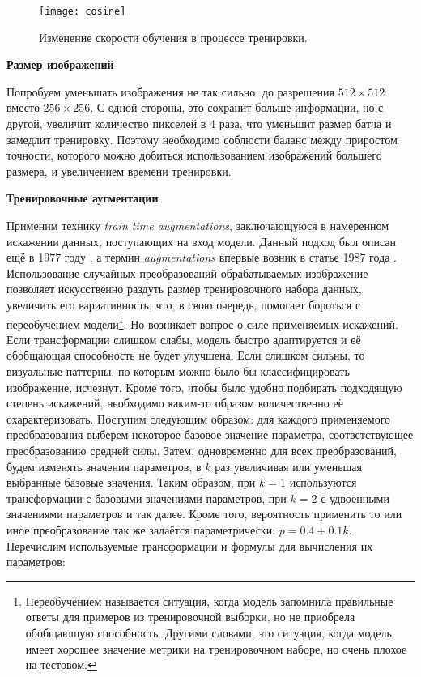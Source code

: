 \begin{figure}[h]
    \begin{center}
   	    \texttt{[image: cosine]}
   	\end{center}
   	\caption{Изменение скорости обучения в процессе тренировки.}
   	\label{tikzpicture: cosine}
\end{figure}


\indent
\indent
\textbf{Размер изображений}

\indent
Попробуем уменьшать изображения не так сильно: 
до разрешения $512 \times 512$ вместо $256 \times 256 $.
С одной стороны, это сохранит больше информации, но с другой, увеличит 
количество пикселей в 4 раза, что уменьшит размер
батча и замедлит тренировку.
Поэтому необходимо соблюсти баланс между приростом точности,
которого можно добиться использованием изображений большего размера,
и увеличением времени тренировки.


\indent    
\indent
\textbf{Тренировочные аугментации}

\indent
Применим технику \textit{train time augmentations}, заключающуюся
в намеренном искажении данных, поступающих на вход модели.
Данный подход был описан ещё в 1977 году \cite{em_augs}, а термин 
\textit{augmentations} впервые возник в статье 1987 года \cite{augs}.
Использование случайных преобразований обрабатываемых
изображение позволяет искусственно
раздуть размер тренировочного набора данных, увеличить его 
вариативность, что, в свою очередь, помогает бороться с переобучением
модели\footnote{Переобучением называется ситуация, когда модель
запомнила правильные ответы для примеров из тренировочной выборки,
но не приобрела обобщающую способность. Другими словами, это ситуация,
когда модель имеет хорошее значение метрики на тренировочном наборе,
но очень плохое на тестовом.}.
Но возникает вопрос о силе применяемых искажений.
Если трансформации слишком слабы, модель быстро адаптируется
 и её обобщающая 
способность не будет улучшена. Если слишком сильны, то визуальные паттерны, по
которым можно было бы классифицировать изображение, исчезнут. 
Кроме того, чтобы было удобно подбирать подходящую степень искажений,
необходимо каким-то образом количественно её охарактеризовать.
Поступим следующим образом:
для каждого применяемого преобразования выберем некоторое базовое значение 
параметра, соответствующее преобразованию средней силы. 
Затем, одновременно для всех преобразований, будем изменять значения параметров,
в $k$ раз увеличивая или уменьшая выбранные базовые значения.
Таким образом, при $k = 1$ используются трансформации 
с базовыми значениями параметров, при $k = 2$ с удвоенными 
значениями параметров и так далее. Кроме того, вероятность применить то или
иное преобразование так же задаётся параметрически:
$p = 0.4 + 0.1k$.
Перечислим используемые трансформации
и формулы для вычисления их параметров:

